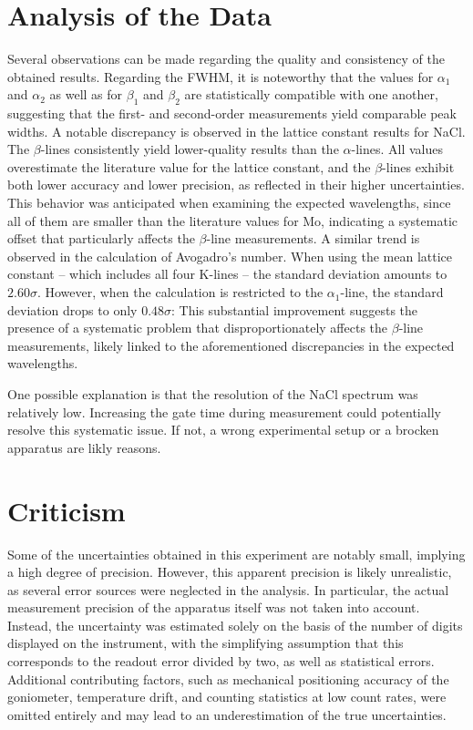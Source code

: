 \section{Analysis of the Data}
\label{sec:Analyse}
Several observations can be made regarding the quality and consistency of the obtained results. Regarding the FWHM, it is noteworthy that the values for $\alpha_1$ and $\alpha_2$ as well as for $\beta_1$ and $\beta_2$ are statistically compatible with one another, suggesting that the first- and second-order measurements yield comparable peak widths.
A notable discrepancy is observed in the lattice constant results for NaCl. The $\beta$-lines consistently yield lower-quality results than the $\alpha$-lines. All values overestimate the literature value for the lattice constant, and the $\beta$-lines exhibit both lower accuracy and lower precision, as reflected in their higher uncertainties. This behavior was anticipated when examining the expected wavelengths, since all of them are smaller than the literature values for Mo, indicating a systematic offset that particularly affects the $\beta$-line measurements.
A similar trend is observed in the calculation of Avogadro's number. When using the mean lattice constant -- which includes all four K-lines -- the standard deviation amounts to $2.60\sigma$. However, when the calculation is restricted to the $\alpha_1$-line, the standard deviation drops to only $0.48\sigma$:
This substantial improvement suggests the presence of a systematic problem that disproportionately affects the $\beta$-line measurements, likely linked to the aforementioned discrepancies in the expected wavelengths.

One possible explanation is that the resolution of the NaCl spectrum was relatively low. Increasing the gate time during measurement could potentially resolve this systematic issue. If not, a wrong experimental setup or a brocken apparatus are likly reasons.

\section{Criticism}
\label{sec:Kritik}
Some of the uncertainties obtained in this experiment are notably small, implying a high degree of precision. However, this apparent precision is likely unrealistic, as several error sources were neglected in the analysis. In particular, the actual measurement precision of the apparatus itself was not taken into account. Instead, the uncertainty was estimated solely on the basis of the number of digits displayed on the instrument, with the simplifying assumption that this corresponds to the readout error divided by two, as well as statistical errors. Additional contributing factors, such as mechanical positioning accuracy of the goniometer, temperature drift, and counting statistics at low count rates, were omitted entirely and may lead to an underestimation of the true uncertainties.

